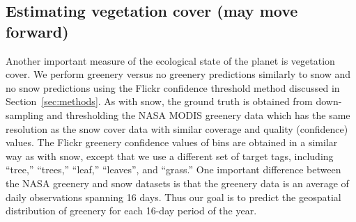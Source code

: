 \subsection{Estimating vegetation cover (may move forward)}

Another important measure of the ecological state of the planet is
vegetation cover.  We perform greenery versus no greenery predictions
similarly to snow and no snow predictions using the Flickr confidence
threshold method discussed in Section~\ref{sec:methods}.  As with
snow, the ground truth is obtained from down-sampling and thresholding
the NASA MODIS greenery data which has the same resolution as the snow
cover data with similar coverage and quality (confidence) values. The
Flickr greenery confidence values of bins are obtained in a similar
way as with snow, except that we use a different set of target tags,
including ``tree,'' ``trees,'' ``leaf,'' ``leaves'', and ``grass.''
One important difference between the NASA greenery and snow datasets
is that the greenery data is an average of daily observations spanning
16 days. Thus our goal is to predict the geospatial distribution of
greenery for each 16-day period of the year.

